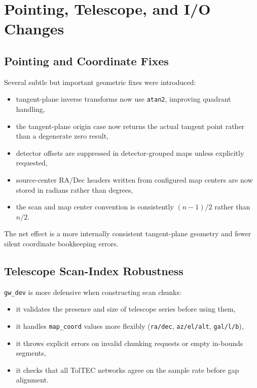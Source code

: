 \documentclass[11pt]{article}
\begin{document}
\section{Pointing, Telescope, and I/O Changes}

\subsection{Pointing and Coordinate Fixes}

Several subtle but important geometric fixes were introduced:

\begin{itemize}[leftmargin=1.5em]
\item tangent-plane inverse transforms now use \texttt{atan2}, improving
quadrant handling,
\item the tangent-plane origin case now returns the actual tangent point rather
than a degenerate zero result,
\item detector offsets are suppressed in detector-grouped maps unless explicitly
requested,
\item source-center RA/Dec headers written from configured map centers are now
stored in radians rather than degrees,
\item the scan and map center convention is consistently \((n-1)/2\) rather
than \(n/2\).
\end{itemize}

The net effect is a more internally consistent tangent-plane geometry and fewer
silent coordinate bookkeeping errors.

\subsection{Telescope Scan-Index Robustness}

\texttt{gw\_dev} is more defensive when constructing scan chunks:

\begin{itemize}[leftmargin=1.5em]
\item it validates the presence and size of telescope series before using them,
\item it handles \texttt{map\_coord} values more flexibly
(\texttt{ra/dec}, \texttt{az/el/alt}, \texttt{gal/l/b}),
\item it throws explicit errors on invalid chunking requests or empty in-bounds
segments,
\item it checks that all TolTEC networks agree on the sample rate before gap
alignment.
\end{itemize}
\end{document}

